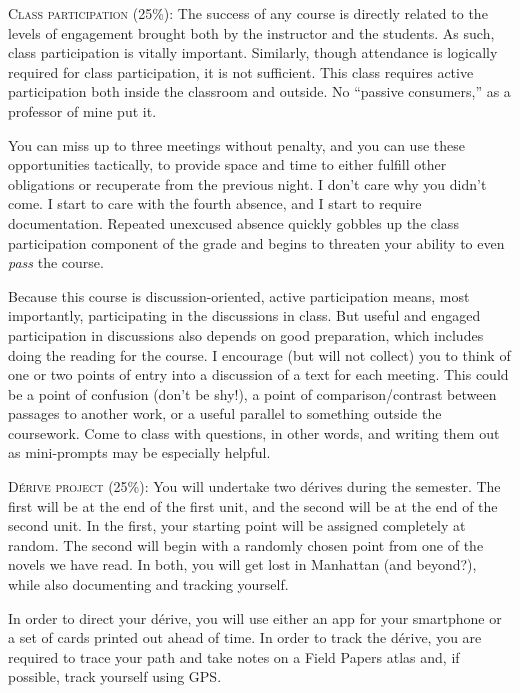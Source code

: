\begin{description}

  \item \textsc{Class participation (25\%):} The success of any course is
    directly related to the levels of engagement brought both by the instructor
    and the students. As such, class participation is vitally important.
    Similarly, though attendance is logically required for class participation,
    it is not sufficient. This class requires active participation both inside
    the classroom and outside. No “passive consumers,” as a professor of mine
    put it. 
    
    You can miss up to three meetings without penalty, and you can use these
    opportunities tactically, to provide space and time to either fulfill
    other obligations or recuperate from the previous night. I don’t care why
    you didn’t come. I start to care with the fourth absence, and I start to
    require documentation. Repeated unexcused absence quickly gobbles up the
    class participation component of the grade and begins to threaten your
    ability to even \textit{pass} the course.

    Because this course is discussion-oriented, active participation means,
    most importantly, participating in the discussions in class. But useful and
    engaged participation in discussions also depends on good preparation,
    which includes doing the reading for the course. I encourage (but will not
    collect) you to think of one or two points of entry into a discussion of a
    text for each meeting. This could be a point of confusion (don’t be shy!),
    a point of comparison/contrast between passages to another work, or a
    useful parallel to something outside the coursework. Come to class with
    questions, in other words, and writing them out as mini-prompts may be
    especially helpful.

  \item \textsc{Dérive project (25\%):} You will undertake two dérives during
    the semester. The first will be at the end of the first unit, and the
    second will be at the end of the second unit. In the first, your starting
    point will be assigned completely at random. The second will begin with a
    randomly chosen point from one of the novels we have read. In both, you
    will get lost in Manhattan (and beyond?), while also documenting and
    tracking yourself.
    
    In order to direct your dérive, you will use either an app for your
    smartphone or a set of cards printed out ahead of time. In order to track
    the dérive, you are required to trace your path and take notes on a Field
    Papers atlas and, if possible, track yourself using GPS.


\end{description}
